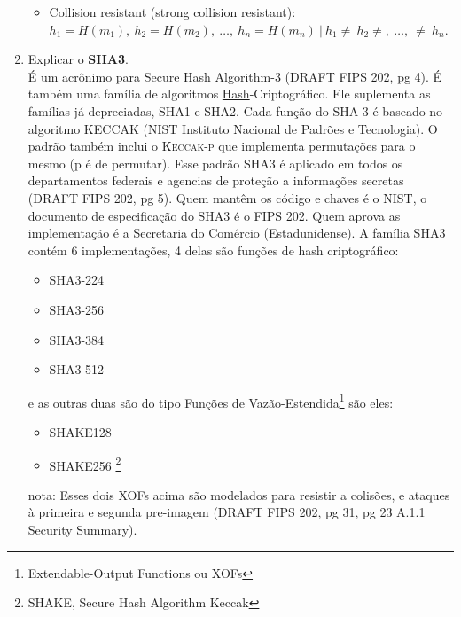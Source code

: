 \documentclass[12pt, a4paper]{article}
\begin{document}
\begin{enumerate}
\begin{itemize}
    \item Collision resistant (strong collision resistant): $h_1 = H(m_1),\
    h_2=H(m_2),\ \ldots,\ h_n=H(m_n)\  \vert\ h_1 \not=\ h_2 \not=,\ \ldots,\
    \not=\ h_n$.\\
  \end{itemize}

\item Explicar o \textbf{SHA3}.\\

\label{sha3-inicial}
É um acrônimo para Secure Hash Algorithm-3 (DRAFT FIPS 202, pg 4). É também uma
família de algoritmos \underline{Hash}-Criptográfico. Ele suplementa as famílias
já depreciadas, SHA1 e SHA2. Cada função do SHA-3 é baseado no algoritmo
\textsc{KECCAK}\cite{keccak} (NIST Instituto Nacional de Padrões e Tecnologia).
O padrão também inclui o \textsc{Keccak-p} que implementa permutações para o
mesmo (p é de permutar). Esse padrão SHA3 é aplicado em todos os departamentos
federais e agencias de proteção a informações secretas (DRAFT FIPS 202, pg 5).
Quem mantêm os código e chaves é o NIST, o documento de especificação do SHA3 é
o FIPS 202. Quem aprova as implementação é a Secretaria do Comércio
(Estadunidense). A família SHA3 contém 6 implementações, 4 delas são funções de
hash criptográfico:\\

  \begin{itemize}
    \item SHA3-224 \item SHA3-256 \item SHA3-384 \item SHA3-512\\
  \end{itemize}

e as outras duas são do tipo Funções de
Vazão-Estendida\footnote{Extendable-Output Functions ou XOFs} são eles:\\

  \begin{itemize}
    \item SHAKE128 \item SHAKE256 \footnote{SHAKE, Secure Hash Algorithm
    Keccak}\\
  \end{itemize}

\item[\color{Aquamarine} nota:] Esses dois XOFs acima são modelados para
resistir a colisões, e ataques à primeira e segunda pre-imagem (DRAFT FIPS 202,
pg 31, pg 23 A.1.1 Security Summary).\\


\end{enumerate}
\end{document}
